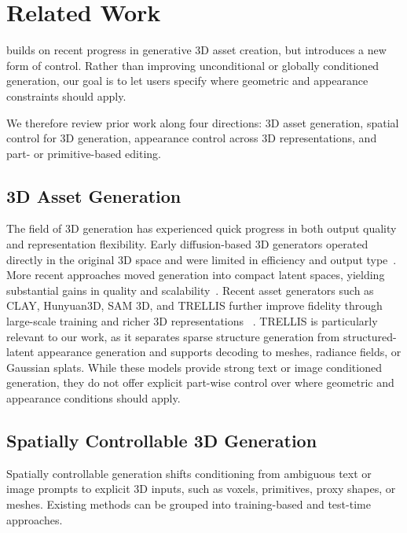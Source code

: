 
\section{Related Work}
\noindent \methodname builds on recent progress in generative 3D asset creation, but introduces a new form of control. Rather than improving unconditional or globally conditioned generation, our goal is to let users specify where geometric and appearance constraints should apply. 

We therefore review prior work along four directions: 3D asset generation, spatial control for 3D generation, appearance control across 3D representations, and part- or primitive-based editing.

\subsection{3D Asset Generation}
\label{sec:rw_3d_generation}
The field of 3D generation has experienced quick progress in both output quality and representation flexibility. Early diffusion-based 3D generators operated directly in the original 3D space and were limited in efficiency and output type~\cite{nichol2022pointegenerating3dpoint}. More recent approaches moved generation into compact latent spaces, yielding substantial gains in quality and scalability~\cite{NEURIPS2022_40e56dab,jun2023shapegeneratingconditional3d}. Recent asset generators such as CLAY, Hunyuan3D, SAM 3D, and TRELLIS further improve fidelity through large-scale training and richer 3D representations ~\cite{10.1145/3658146,hunyuan3d22025tencent,Chen_2026_CVPR,Xiang_2025_CVPR}. TRELLIS is particularly relevant to our work, as it separates sparse structure generation from structured-latent appearance generation and supports decoding to meshes, radiance fields, or Gaussian splats. While these models provide strong text or image conditioned generation, they do not offer explicit part-wise control over where geometric and appearance conditions should apply.


\subsection{Spatially Controllable 3D Generation} 
\label{sec:rw_spatial_control}

Spatially controllable generation shifts conditioning from ambiguous text or image prompts to explicit 3D inputs, such as voxels, primitives, proxy shapes, or meshes. Existing methods can be grouped into training-based and test-time approaches. 

